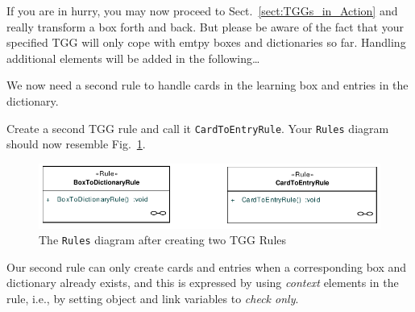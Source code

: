 If you are in hurry, you may now proceed to Sect.~\ref{sect:TGGs_in_Action} and really transform a box forth and back.
But please be aware of the fact that your specified TGG will only cope with emtpy boxes and dictionaries so far. Handling additional elements will be added in the following\ldots

We now need a second rule to handle cards in the learning box and entries in the dictionary.

Create a second TGG rule and call it \texttt{CardToEntryRule}.
Your \texttt{Rules} diagram should now resemble Fig.~\ref{fig:rules_diagram}.

\begin{figure}[htbp]
\begin{center}
  \includegraphics[width=\textwidth]{pics/tggBilder/tggRule/tgg16}
  \caption{The \texttt{Rules} diagram after creating two TGG Rules}  
  \label{fig:rules_diagram}
\end{center}
\end{figure}

Our second rule can only create cards and entries when a corresponding box and dictionary already exists, and this is expressed by using \emph{context} elements in the rule, i.e., by setting object and link variables to \emph{check only}.

